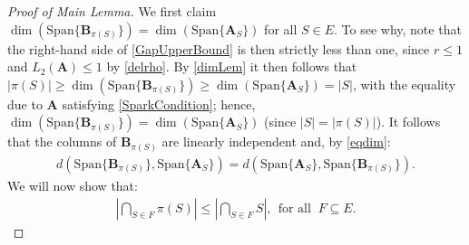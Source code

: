 \documentclass[9pt,twocolumn]{pnas-new}
\begin{document}
\begin{proof}[Proof of Main Lemma]
We first claim $\dim(\text{Span}\{\mathbf{B}_{\pi(S)}\}) = \dim(\text{Span}\{\mathbf{A}_{S}\})$ for all $S \in E$. To see why, note that the right-hand side of \eqref{GapUpperBound} is then strictly less than one, since $r \leq 1$ and $L_2(\mathbf{A}) \leq 1$ by \eqref{delrho}. By \eqref{dimLem} it then follows that $|\pi(S)| \geq \dim(\text{Span}\{\mathbf{B}_{\pi(S)}\}) \geq \dim(\text{Span}\{\mathbf{A}_{S}\}) = |S|$, with the equality due to $\mathbf{A}$ satisfying \eqref{SparkCondition}; hence, $\dim(\text{Span}\{\mathbf{B}_{\pi(S)}\}) = \dim(\text{Span}\{\mathbf{A}_{S}\})$ (since $|S| = |\pi(S)|$). It follows that the columns of $\mathbf{B}_{\pi(S)}$ are linearly independent and, by \eqref{eqdim}:%
\begin{align}\label{eq2}
d(\text{Span}\{\mathbf{B}_{\pi(S)}\}, \text{Span}\{\mathbf{A}_S\} ) = d(\text{Span}\{\mathbf{A}_S\}, \text{Span}\{\mathbf{B}_{\pi(S)}\}).
\end{align}
We will now show that:
\begin{align}\label{fact2}
|\bigcap_{S \in F} \pi(S)| \leq |\bigcap_{S \in F} S |, \ \ \text{for all } \ F \subseteq E.
\end{align}


\end{proof}
\end{document}
